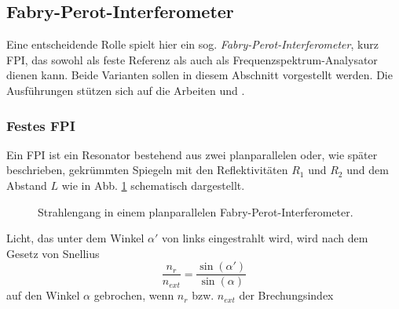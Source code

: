\subsection{Fabry-Perot-Interferometer}\label{subsec:fabry-perot-interferometer}
Eine entscheidende Rolle spielt hier ein sog.
\textit{Fabry-Perot-Interferometer}, kurz FPI, das sowohl
als feste Referenz als auch als Frequenzspektrum-Analysator dienen kann.
Beide Varianten sollen in diesem Abschnitt vorgestellt werden. Die Ausführungen
stützen sich auf die Arbeiten \cite{wiche:1997:diplomarbeit} und
\cite{kuschnick:2000:diplomarbeit}.

\subsubsection{Festes FPI}\label{subsubsec:festes_FPI}
Ein FPI ist ein Resonator bestehend aus zwei planparallelen oder, wie später
beschrieben, gekrümmten Spiegeln mit den Reflektivitäten $R_1$ und $R_2$ und dem
Abstand $L$ wie in Abb.
\ref{fig:FPI_planparallel} schematisch dargestellt.
\begin{figure}[h]
 	\centering
	\caption[FPI - planparallel]{Strahlengang in einem
	planparallelen Fabry-Perot-Interferometer.}
	\label{fig:FPI_planparallel}
\end{figure}
Licht, das unter dem Winkel
$\alpha'$ von links eingestrahlt wird, wird nach dem Gesetz von Snellius
\begin{equation}\label{eq:snellius}
	\frac{n_r}{n_{ext}}=\frac{\sin{(\alpha')}}{\sin{(\alpha)}}
\end{equation}
auf den Winkel $\alpha$ gebrochen, wenn $n_r$ bzw. $n_{ext}$ der Brechungsindex
